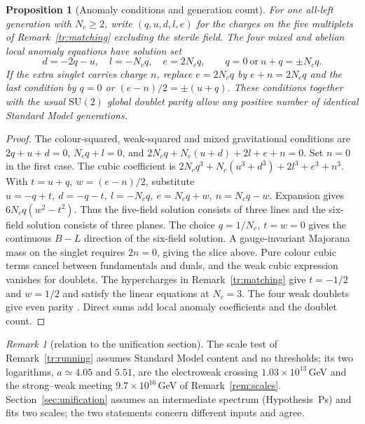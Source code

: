 \documentclass[aps,pra,onecolumn,superscriptaddress,nofootinbib,10pt]{revtex4-2}
\newtheorem{proposition}[theorem]{Proposition}
\theoremstyle{definition}
\theoremstyle{remark}
\newtheorem{remark}[theorem]{Remark}
\newcommand{\SU}{\mathrm{SU}}
\begin{document}
\begin{proposition}[Anomaly conditions and generation count]\label{tr:anomaly}
For one all-left generation with \(N_c\geq2\), write \((q,u,d,l,e)\)
for the charges on the five multiplets of Remark~\ref{tr:matching}
excluding the sterile field. The four mixed and abelian local
anomaly equations have solution set
\[
 d=-2q-u,\quad l=-N_cq,\quad e=2N_cq,\qquad
 q=0\ \text{or}\ u+q=\pm N_cq.
\]
If the extra singlet carries charge \(n\), replace \(e=2N_cq\)
by \(e+n=2N_cq\) and the last condition by \(q=0\) or
\((e-n)/2=\pm(u+q)\). These conditions together with the usual
\(\SU(2)\) global doublet parity allow any positive
number of identical Standard Model generations.
\end{proposition}
\begin{proof}
The colour-squared, weak-squared and mixed gravitational
conditions are \(2q+u+d=0\), \(N_cq+l=0\), and
\(2N_cq+N_c(u+d)+2l+e+n=0\). Set \(n=0\) in the first case.
The cubic coefficient is \(2N_cq^3+N_c(u^3+d^3)+2l^3+e^3+n^3\).
With \(t=u+q,\ w=(e-n)/2\), substitute
\(u=-q+t,\ d=-q-t,\ l=-N_cq,\ e=N_cq+w,\ n=N_cq-w\).
Expansion gives \(6N_cq(w^2-t^2)\).
Thus the five-field solution consists of three lines and the
six-field solution consists of three planes.
The choice \(q=1/N_c,\ t=w=0\) gives the continuous \(B-L\)
direction of the six-field solution. A gauge-invariant Majorana
mass on the singlet requires \(2n=0\), giving the slice above.
Pure colour cubic terms cancel between fundamentals and duals,
and the weak cubic expression vanishes for doublets.
The hypercharges in Remark~\ref{tr:matching} give \(t=-1/2\)
and \(w=1/2\) and satisfy the linear equations at \(N_c=3\).
The four weak doublets give even parity \cite{ub:witten}.
Direct sums add local anomaly coefficients and the doublet count.
\end{proof}

\begin{remark}[relation to the unification section]\label{rem:trunif}
The scale test of Remark~\ref{tr:running} assumes Standard Model content and no thresholds; its two logarithms, $a\simeq4.05$ and $5.51$, are the
electroweak crossing $1.03\times10^{13}$\,GeV and the strong--weak meeting $9.7\times10^{16}$\,GeV of Remark~\ref{rem:scales}.
Section~\ref{sec:unification} assumes an intermediate spectrum (Hypothesis~Ps) and fits two scales; the two
statements concern different inputs and agree.
\end{remark}
\end{document}
